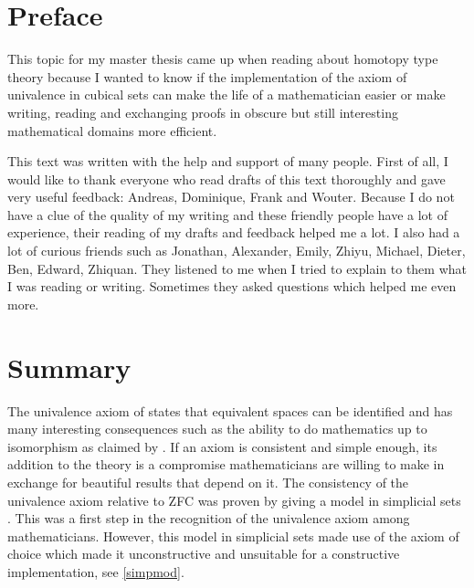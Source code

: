 \documentclass[12pt,a4paper,twoside,xetex]{book}
\begin{document}
\setcounter{page}{0}

\chapter*{Preface}

This topic for my master thesis came up when reading about homotopy type 
theory because I wanted to know if the implementation of the axiom of 
univalence in cubical sets can make the life of a mathematician easier or
make writing, reading and exchanging proofs in obscure but still interesting 
mathematical domains more efficient.

This text was written with the help and support of many people. First of all, I 
would like to thank everyone who read drafts of this text thoroughly and gave 
very useful feedback: Andreas, Dominique, Frank and Wouter. Because I do not 
have a clue of the quality of my writing and these friendly people have a lot 
of experience, their reading of my drafts and feedback helped me a lot. I also 
had a lot of curious friends such as Jonathan, Alexander, Emily, Zhiyu, 
Michael, Dieter, Ben, Edward, Zhiquan.  They listened to me when I tried to 
explain to them what I was reading or writing. Sometimes they asked questions 
which helped me even more.

\chapter*{Summary}


The univalence axiom of states that equivalent spaces can be identified and has many interesting consequences such as the ability to do mathematics up to isomorphism as claimed by \cite{Voevodsky2013}. If an axiom is consistent and simple enough, its addition to the theory is a compromise mathematicians are willing to make in exchange for beautiful results that depend on it. The  consistency of the univalence axiom relative to ZFC was proven by giving a model in simplicial sets \cite{Kapulkin2012}. This was a first step in the recognition of the univalence axiom among mathematicians. However, this model in simplicial sets made use of the axiom of choice which made it unconstructive and unsuitable for a constructive implementation, see \cref{simpmod}.
\end{document}
